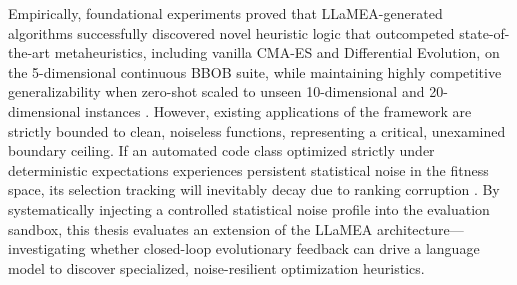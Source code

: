 Empirically, foundational experiments proved that LLaMEA-generated algorithms successfully discovered novel heuristic logic that outcompeted state-of-the-art metaheuristics, including vanilla CMA-ES and Differential Evolution, on the 5-dimensional continuous BBOB suite, while maintaining highly competitive generalizability when zero-shot scaled to unseen 10-dimensional and 20-dimensional instances \cite{LLaMEA2024}. However, existing applications of the framework are strictly bounded to clean, noiseless functions, representing a critical, unexamined boundary ceiling. If an automated code class optimized strictly under deterministic expectations experiences persistent statistical noise in the fitness space, its selection tracking will inevitably decay due to ranking corruption \cite{Jin2005, Hansen2009Noisy}. By systematically injecting a controlled statistical noise profile into the evaluation sandbox, this thesis evaluates an extension of the LLaMEA architecture—investigating whether closed-loop evolutionary feedback can drive a language model to discover specialized, noise-resilient optimization heuristics.


%
%
%
%
%
%
